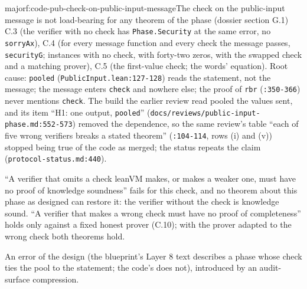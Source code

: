\begin{finding}{major}{f:code-pub-check-on-public-input-message}{The check on the public-input message is not load-bearing for any theorem of the phase (dossier section G.1)}
C.3 (the verifier with no check has \texttt{Phase.\allowbreak{}Security} at the same error, no \texttt{sorryAx}), C.4 (for every message function and every check the message passes, \texttt{securityG}; instances with no check, with forty-two zeros, with the swapped check and a matching prover), C.5 (the first-value check; the words' equation). Root cause: \texttt{pooled} (\texttt{PublicInput.\allowbreak{}lean:127-{}128}) reads the statement, not the message; the message enters \texttt{check} and nowhere else; the proof of \texttt{rbr} (\texttt{:350-{}366}) never mentions \texttt{check}. The build the earlier review read pooled the values sent, and its item \enquote{H1: one output, \texttt{pooled}} (\texttt{d\allowbreak{}o\allowbreak{}c\allowbreak{}s\allowbreak{}/\allowbreak{}r\allowbreak{}e\allowbreak{}v\allowbreak{}i\allowbreak{}e\allowbreak{}w\allowbreak{}s\allowbreak{}/\allowbreak{}p\allowbreak{}u\allowbreak{}b\allowbreak{}l\allowbreak{}i\allowbreak{}c\allowbreak{}-{}\allowbreak{}i\allowbreak{}n\allowbreak{}p\allowbreak{}u\allowbreak{}t\allowbreak{}-{}\allowbreak{}p\allowbreak{}h\allowbreak{}a\allowbreak{}s\allowbreak{}e\allowbreak{}.\allowbreak{}m\allowbreak{}d\allowbreak{}:\allowbreak{}5\allowbreak{}5\allowbreak{}2\allowbreak{}-{}\allowbreak{}5\allowbreak{}7\allowbreak{}3}) removed the dependence, so the same review's table \enquote{each of five wrong verifiers breaks a stated theorem} (\texttt{:104-{}114}, rows (i) and (v)) stopped being true of the code as merged; the status repeats the claim (\texttt{protocol-{}status.\allowbreak{}md:440}).

\enquote{A verifier that omits a check leanVM makes, or makes a weaker one, must have no proof of knowledge soundness} fails for this check, and no theorem about this phase as designed can restore it: the verifier without the check is knowledge sound. \enquote{A verifier that makes a wrong check must have no proof of completeness} holds only against a fixed honest prover (C.10); with the prover adapted to the wrong check both theorems hold.

An error of the design (the blueprint's Layer 8 text describes a phase whose check ties the pool to the statement; the code's does not), introduced by an audit-surface compression.


\end{finding}
